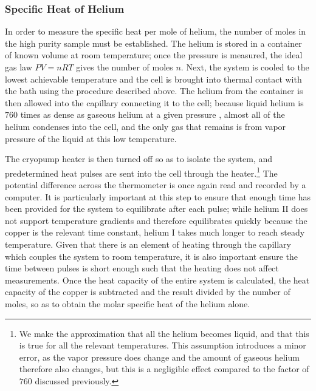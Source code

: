 \subsubsection{Specific Heat of Helium}
In order to measure the specific heat per mole of helium, the number
of moles in the high purity sample must be established. The helium is
stored in a container of known volume at room temperature; once the
pressure is measured, the ideal gas law $P V = n R T$ gives the number
of moles $n$. Next, the system is cooled to the lowest achievable
temperature and the cell is brought into thermal contact with the bath
using the procedure described above. The helium from the container is
then allowed into the capillary connecting it to the cell; because
liquid helium is $760$ times as dense as gaseous helium at a given
pressure \cite{shi}, almost all of the helium condenses into the cell,
and the only gas that remains is from vapor pressure of the liquid at
this low temperature. 

The cryopump heater is then turned off so as to isolate the system,
and predetermined heat pulses are sent into the cell through the
heater.\footnote{We make the approximation that all the helium
  becomes liquid, and that this is true for all the relevant
  temperatures. This assumption introduces a minor error, as the vapor
  pressure does change and the amount of gaseous helium therefore also
  changes, but this is a negligible effect compared to the factor of
  $760$ discussed previously.} The potential difference across the
thermometer is once again read and recorded by a computer. It is
particularly important at this step to ensure that enough time has
been provided for the system to equilibrate after each pulse; while
helium II does not support temperature gradients and therefore
equilibrates quickly because the copper is the relevant time constant,
helium I takes much longer to reach steady temperature. Given that
there is an element of heating through the capillary which couples the
system to room temperature, it is also important ensure the time
between pulses is short enough such that the heating does not affect
measurements.  Once the heat capacity of the entire system is
calculated, the heat capacity of the copper is subtracted and the
result divided by the number of moles, so as to obtain the molar
specific heat of the helium alone.
